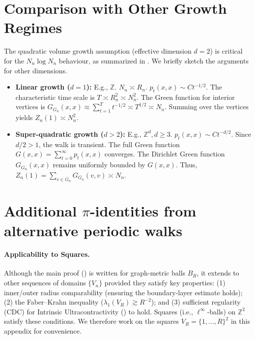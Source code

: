 \documentclass{article}
\numberwithin{equation}{section}
\theoremstyle{definition}
\theoremstyle{remark}
\begin{document}
\appendix

\section{Comparison with Other Growth Regimes}\label{app:growth}
The quadratic volume growth assumption (effective dimension $d=2$) is critical for the $N_n \log N_n$ behaviour, as summarized in . We briefly sketch the arguments for other dimensions.

\begin{itemize}
\item \textbf{Linear growth ($d=1$):} E.g., $\mathbb{Z}$. $N_n \asymp R_n$. $p_t(x,x) \sim C t^{-1/2}$. The characteristic time scale is $T \asymp R_n^2 \asymp N_n^2$. The Green function for interior vertices is $G_{G_n}(x,x) \approx \sum_{t=1}^{T} t^{-1/2} \asymp T^{1/2} \asymp N_n$. Summing over the vertices yields $Z_n(1) \asymp N_n^2$.

\item \textbf{Super-quadratic growth ($d>2$):} E.g., $\mathbb{Z}^d, d\geq 3$. $p_t(x,x) \sim C t^{-d/2}$. Since $d/2 > 1$, the walk is transient. The full Green function $G(x,x) = \sum_{t=0}^{\infty} p_t(x,x)$ converges. The Dirichlet Green function $G_{G_n}(x,x)$ remains uniformly bounded by $G(x,x)$. Thus, $Z_n(1) = \sum_{v \in G_n} G_{G_n}(v,v) \asymp N_n$.
\end{itemize}


\section{Additional $\pi$-identities from alternative periodic walks}
\label{app:alt_pi}

\paragraph{Applicability to Squares.}
Although the main proof () is written for graph-metric balls $B_R$, it extends to other sequences of domains $\{V_n\}$ provided they satisfy key properties: (1) inner/outer radius comparability (ensuring the boundary-layer estimate holds); (2) the Faber–Krahn inequality ($\lambda_1(V_R) \gtrsim R^{-2}$); and (3) sufficient regularity (CDC) for Intrinsic Ultracontractivity () to hold. Squares (i.e., $\ell^\infty$-balls) on $\mathbb{Z}^2$ satisfy these conditions. We therefore work on the squares $V_R=\{1,\dots,R\}^2$ in this appendix for convenience.
\medskip
\end{document}
